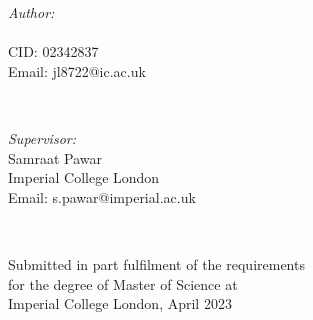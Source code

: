 \begin{titlepage}
    \begin{minipage}{0.4\textwidth}
    \begin{flushleft} \large
    \emph{Author:}\\
    \@author \\%
    CID: 02342837\\
    Email: jl8722@ic.ac.uk
    \end{flushleft}
    \end{minipage}
    ~
    \begin{minipage}{0.4\textwidth}
    \begin{flushright} \large
    \emph{Supervisor:} \\
    Samraat Pawar \\
    Imperial College London\\
    Email: s.pawar@imperial.ac.uk
    \end{flushright}
    \end{minipage}\\[3cm]
    \makeatother
    
    
    
    {\large Submitted in part fulfilment of the requirements}\\[0.5cm]
    {\large for the degree of Master of Science at}\\[0.5cm]
    {\large Imperial College London, April 2023}\\[0.5cm] %
    
    \vfill %
    
    \end{titlepage}